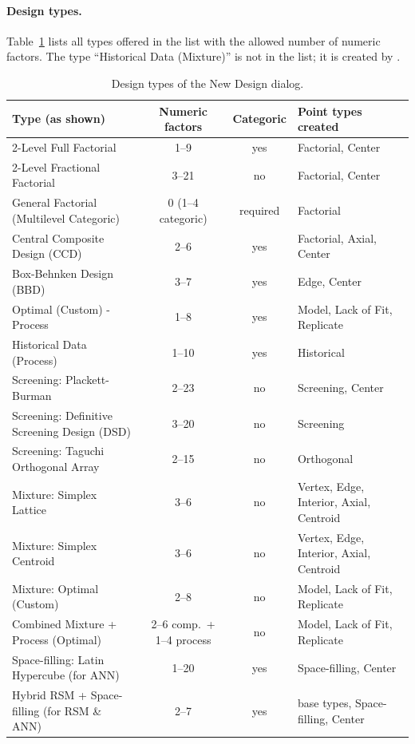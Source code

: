 \paragraph{Design types.} Table~\ref{tab:ch03-types} lists all types offered in the  list with the
allowed number of numeric factors. The type ``Historical Data (Mixture)'' is not in the list; it is created by
.

\begin{table}[htbp]
\centering
\caption{Design types of the New Design dialog.}
\label{tab:ch03-types}
\small
\begin{tabularx}{\linewidth}{@{}lcc X@{}}
\toprule
Type (as shown) & Numeric factors & Categoric & Point types created \\
\midrule
2-Level Full Factorial & 1--9 & yes & Factorial, Center \\
2-Level Fractional Factorial & 3--21 & no & Factorial, Center \\
General Factorial (Multilevel Categoric) & 0 (1--4 categoric) & required & Factorial \\
Central Composite Design (CCD) & 2--6 & yes & Factorial, Axial, Center \\
Box-Behnken Design (BBD) & 3--7 & yes & Edge, Center \\
Optimal (Custom) - Process & 1--8 & yes & Model, Lack of Fit, Replicate \\
Historical Data (Process) & 1--10 & yes & Historical \\
Screening: Plackett-Burman & 2--23 & no & Screening, Center \\
Screening: Definitive Screening Design (DSD) & 3--20 & no & Screening \\
Screening: Taguchi Orthogonal Array & 2--15 & no & Orthogonal \\
Mixture: Simplex Lattice & 3--6 & no & Vertex, Edge, Interior, Axial, Centroid \\
Mixture: Simplex Centroid & 3--6 & no & Vertex, Edge, Interior, Axial, Centroid \\
Mixture: Optimal (Custom) & 2--8 & no & Model, Lack of Fit, Replicate \\
Combined Mixture + Process (Optimal) & 2--6 comp.\ + 1--4 process & no & Model, Lack of Fit, Replicate \\
Space-filling: Latin Hypercube (for ANN) & 1--20 & yes & Space-filling, Center \\
Hybrid RSM + Space-filling (for RSM \& ANN) & 2--7 & yes & base types, Space-filling, Center \\
\bottomrule
\end{tabularx}
\end{table}

